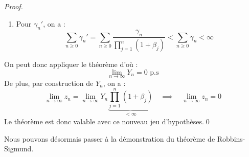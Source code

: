 \begin{proof}
\begin{enumerate}[label=\roman*]
        Par comparaison : 
            $$ \sum_{n \geqslant 0} \alpha_n < \infty \text{ p.s } \quad \Longrightarrow \quad \sum_{n \geqslant 0} \alpha_n' < \infty \text{ p.s } $$ 
        \item Pour $ \gamma_n'$, on a : 
            $$ \sum_{n \geqslant 0} \gamma_n' = \sum_{n \geqslant 0} \frac{ \gamma_n}{ \prod_{j=1}^{n} (1 + \beta_j)} < \sum_{n \geqslant 0} \gamma_n < \infty $$ 
    \end{enumerate}
    On peut donc appliquer le théorème d'où : 
        $$ \lim_{n \to \infty} Y_n = 0 \text{ p.s} $$ 
    De plus, par construction de $Y_n$, on a : 
        $$ \lim_{n \to \infty} z_n = \lim_{n \to \infty} Y_n \underbrace{\prod_{j=1}^{n} (1 + \beta_j)}_{< \infty} \quad
            \implies \quad \lim_{n \to \infty} z_n = 0 $$
    Le théorème est donc valable avec ce nouveau jeu d'hypothèses.\qed
\end{proof}

Nous pouvons désormais passer à la démonstration du théorème de Robbins-Sigmund.


